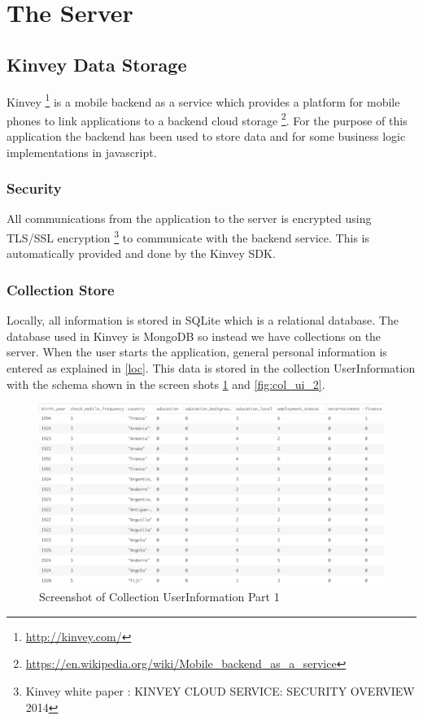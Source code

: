 \section{The Server}

\subsection{Kinvey Data Storage}

Kinvey \footnote{\url{http://kinvey.com/}} is a mobile backend as a service which provides a platform for mobile phones to link applications to a backend cloud storage \footnote{\url{https://en.wikipedia.org/wiki/Mobile_backend_as_a_service}}. For the purpose of this application the backend has been used to store data and for some business logic implementations in javascript.

\subsubsection{Security}

All communications from the application to the server is encrypted using TLS/SSL encryption \footnote{Kinvey white paper : KINVEY CLOUD
SERVICE: SECURITY
OVERVIEW 2014} to communicate with the backend service. This is automatically provided and done by the Kinvey SDK.

\subsubsection{Collection Store}

Locally, all information is stored in SQLite which is a relational database. The database used in Kinvey is MongoDB so instead we have collections 
on the server.
When the user starts the application, general personal information is entered as explained in \ref{loc}. This data is stored in the
collection UserInformation with the schema shown in the screen shots \ref{fig:col_ui_1} and \ref{fig:col_ui_2}.

\begin{figure}[ht!]
\centering
\includegraphics[width=\textwidth,keepaspectratio,height=0.6\textwidth]{./images/collection_ui_1}
\caption{Screenshot of Collection UserInformation Part 1}
\label{fig:col_ui_1}
\end{figure}

